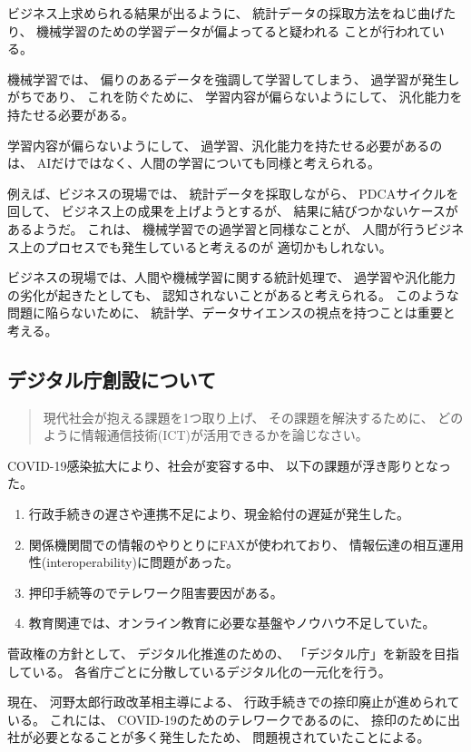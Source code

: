 \documentclass[12pt]{jsarticle}
\begin{document}
ビジネス上求められる結果が出るように、
統計データの採取方法をねじ曲げたり、
機械学習のための学習データが偏よってると疑われる
ことが行われている。

機械学習では、
偏りのあるデータを強調して学習してしまう、
過学習が発生しがちであり、
これを防ぐために、
学習内容が偏らないようにして、
汎化能力を持たせる必要がある。

学習内容が偏らないようにして、
過学習、汎化能力を持たせる必要があるのは、
AIだけではなく、人間の学習についても同様と考えられる。

例えば、ビジネスの現場では、
統計データを採取しながら、
PDCAサイクルを回して、
ビジネス上の成果を上げようとするが、
結果に結びつかないケースがあるようだ。
これは、 機械学習での過学習と同様なことが、
人間が行うビジネス上のプロセスでも発生していると考えるのが
適切かもしれない。

ビジネスの現場では、人間や機械学習に関する統計処理で、
過学習や汎化能力の劣化が起きたとしても、
認知されないことがあると考えられる。
このような問題に陥らないために、
統計学、データサイエンスの視点を持つことは重要と考える。


\subsection{デジタル庁創設について}

\begin{quotation}
現代社会が抱える課題を1つ取り上げ、
その課題を解決するために、
どのように情報通信技術(ICT)が活用できるかを論じなさい。
\end{quotation}

COVID-19感染拡大により、社会が変容する中、
以下の課題が浮き彫りとなった。

\begin{enumerate}
\item 行政手続きの遅さや連携不足により、現金給付の遅延が発生した。
\item 関係機関間での情報のやりとりにFAXが使われており、
    情報伝達の相互運用性(interoperability)に問題があった。
\item 押印手続等のでテレワーク阻害要因がある。
\item 教育関連では、オンライン教育に必要な基盤やノウハウ不足していた。
\end{enumerate}


菅政権の方針として、
デジタル化推進のための、
「デジタル庁」を新設を目指している。
各省庁ごとに分散しているデジタル化の一元化を行う。

現在、
河野太郎行政改革相主導による、
行政手続きでの捺印廃止が進められている。
これには、
COVID-19のためのテレワークであるのに、
捺印のために出社が必要となることが多く発生したため、
問題視されていたことによる。
\end{document}
